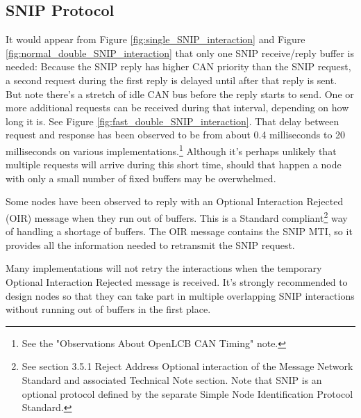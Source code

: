 \documentclass[11pt]{article}
\begin{document}
\subsection{SNIP Protocol}\label{snip_protocol}

It would appear from 
Figure \ref{fig:single_SNIP_interaction}
and 
Figure \ref{fig:normal_double_SNIP_interaction}
that only one SNIP receive/reply buffer is needed:
Because the SNIP reply has higher CAN priority than the SNIP request,
a second request during the first reply is delayed until after that reply is sent.
But note there's a stretch of idle CAN bus
before the reply starts to send.  One or more 
additional requests can be received during that interval, 
depending on how long it is.  See 
Figure \ref{fig:fast_double_SNIP_interaction}.
That delay between request and response has been observed to be 
from about 0.4 milliseconds to 20 milliseconds on various 
\cbstart
implementations.\footnote{
    See the "Observations About OpenLCB CAN Timing" note.
}
\cbend
Although it's perhaps unlikely that multiple requests will arrive during this short time, 
should that happen a node with only a small number of fixed buffers may be 
overwhelmed. 
\cbstart

Some nodes have been observed to reply with an
Optional Interaction Rejected (OIR) message when they run 
out of buffers.  
This is a Standard compliant\footnote{
    See section 3.5.1 Reject Address Optional interaction
    of the Message Network Standard and associated
    Technical Note section.
    Note that SNIP is an optional protocol
    defined by the separate Simple Node Identification Protocol Standard.
}
way of handling a shortage of buffers.
The OIR message contains the SNIP MTI, so it 
provides all the information needed to 
retransmit the SNIP request.

Many implementations will not retry the interactions
when the temporary 
Optional Interaction Rejected message 
is received. It's strongly recommended to design
nodes so that they can take part in multiple overlapping SNIP interactions
without running out of buffers in the first place.

\cbend
\end{document}
